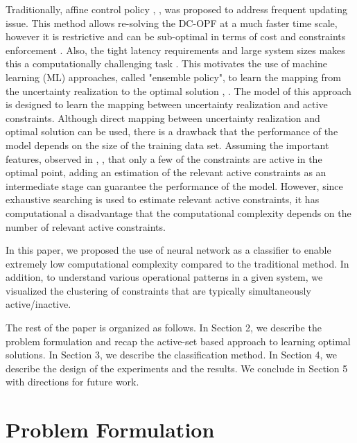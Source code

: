 \documentclass[11pt]{article}
\begin{document}
Traditionally, affine control policy \cite{affine_control1}, \cite{affine_control2}, \cite{affine_control3} was proposed to address frequent updating issue. This method allows re-solving the DC-OPF at a much faster time scale, however it is restrictive and can be sub-optimal in terms of cost and constraints enforcement \cite{affine_control_cons}. Also, the tight latency requirements and large system sizes makes this a computationally challenging task \cite{learning_dc_opf}. 
This motivates the use of machine learning (ML) approaches, called "ensemble policy", to learn the mapping from the uncertainty realization to the optimal solution \cite{statistical_learning}, \cite{learing_constrained_op}. The model of this approach is designed to learn the mapping between uncertainty realization and active constraints. Although direct mapping between uncertainty realization and optimal solution can be used, there is a drawback that the performance of the model depends on the size of the training data set. Assuming the important features, observed in \cite{statistical_learning}, \cite{learing_constrained_op}, that only a few of the constraints are active in the optimal point, adding an estimation of the relevant active constraints as an intermediate stage can guarantee the performance of the model. However, since exhaustive searching is used to estimate relevant active constraints, it has computational a disadvantage that the computational complexity depends on the number of relevant active constraints.

In this paper, we proposed the use of neural network as a classifier to enable extremely low computational complexity compared to the traditional method. In addition, to understand various operational patterns in a given system, we visualized the clustering of constraints that are typically simultaneously active/inactive. 

The rest of the paper is organized as follows. In Section 2, we describe the problem formulation and recap the active-set based approach to learning optimal solutions. In Section 3, we describe the classification method. In Section 4, we describe the design of the experiments and the results. We conclude in Section 5 with directions for future work.


\section{Problem Formulation}\label{sec:problem}
\end{document}
